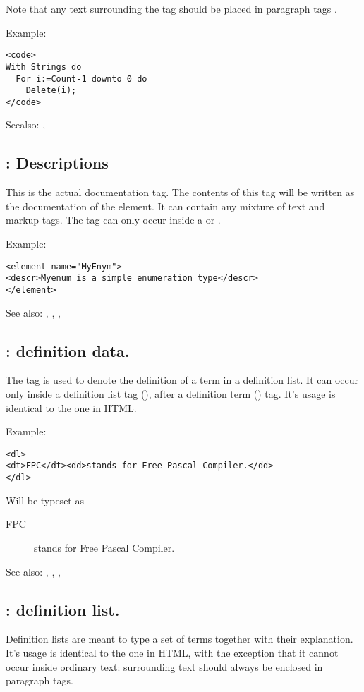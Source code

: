 Note that any text surrounding the  tag should be placed in
paragraph tags .

Example:
\begin{verbatim}
<code>
With Strings do
  For i:=Count-1 downto 0 do
    Delete(i);
</code>
\end{verbatim}

Seealso: , 

\subsection{ : Descriptions}
\label{tag:descr}
This is the actual documentation tag. The contents of this tag will be 
written as the documentation of the element. It can contain any mixture of
text and markup tags. The  tag can only occur inside a
 or .

Example:
\begin{verbatim}
<element name="MyEnym">
<descr>Myenum is a simple enumeration type</descr>
</element>
\end{verbatim}

See also: , , , 

\subsection{ : definition data.}
\label{tag:dd}
The  tag is used to denote the definition of a term in a definition
list. It can occur only inside a definition list tag (), after a
definition term () tag. It's usage is identical to the one in HTML.

Example:
\begin{verbatim}
<dl>
<dt>FPC</dt><dd>stands for Free Pascal Compiler.</dd>
</dl>
\end{verbatim}
Will be typeset as
\begin{description}
\item[FPC] stands for Free Pascal Compiler.
\end{description}

See also: , , , 

\subsection{ : definition list.}
\label{tag:dl}
Definition lists are meant to type a set of terms together with their
explanation. It's usage is identical to the one in HTML, with the exception
that it cannot occur inside ordinary text: surrounding text should always be
enclosed in paragraph tags.

